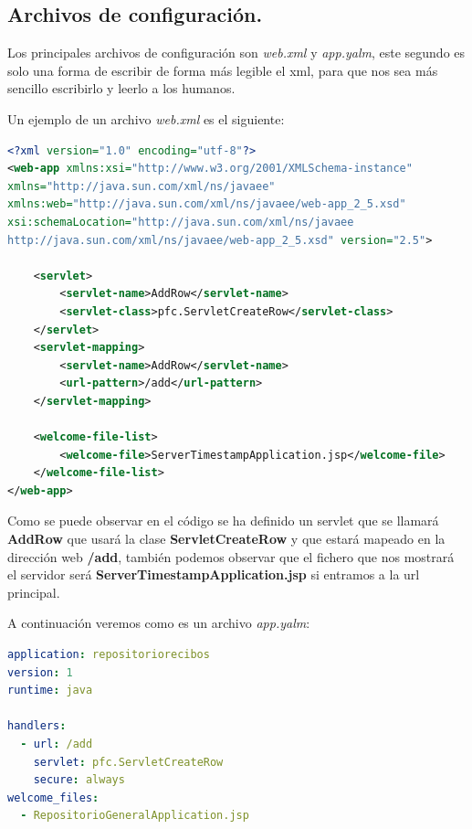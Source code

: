 \subsection{Archivos de configuración.\label{ref_archivos_configuracion_google_app_engine}}
Los principales archivos de configuración son \textit{web.xml} y \textit{app.yalm}, este segundo es solo una forma de escribir de forma más legible el xml, para que nos sea más sencillo escribirlo y leerlo a los humanos.

Un ejemplo de un archivo \textit{web.xml} es el siguiente:

\begin{lstlisting}[language=XML]
<?xml version="1.0" encoding="utf-8"?>
<web-app xmlns:xsi="http://www.w3.org/2001/XMLSchema-instance"
xmlns="http://java.sun.com/xml/ns/javaee"
xmlns:web="http://java.sun.com/xml/ns/javaee/web-app_2_5.xsd"
xsi:schemaLocation="http://java.sun.com/xml/ns/javaee
http://java.sun.com/xml/ns/javaee/web-app_2_5.xsd" version="2.5">

	<servlet>
		<servlet-name>AddRow</servlet-name>
		<servlet-class>pfc.ServletCreateRow</servlet-class>
	</servlet>
	<servlet-mapping>
		<servlet-name>AddRow</servlet-name>
		<url-pattern>/add</url-pattern>
	</servlet-mapping>

	<welcome-file-list>
		<welcome-file>ServerTimestampApplication.jsp</welcome-file>
	</welcome-file-list>
</web-app>
\end{lstlisting}
Como se puede observar en el código se ha definido un servlet que se llamará \textbf{AddRow} que usará la clase \textbf{ServletCreateRow} y que estará mapeado en la dirección web \textbf{/add}, también podemos observar que el fichero que nos mostrará el servidor será \textbf{ServerTimestampApplication.jsp} si entramos a la url principal.

A continuación veremos como es un archivo \textit{app.yalm}:
\begin{lstlisting}[language=YAML]
application: repositoriorecibos
version: 1
runtime: java

handlers:
  - url: /add
    servlet: pfc.ServletCreateRow
    secure: always
welcome_files:
  - RepositorioGeneralApplication.jsp
\end{lstlisting}

